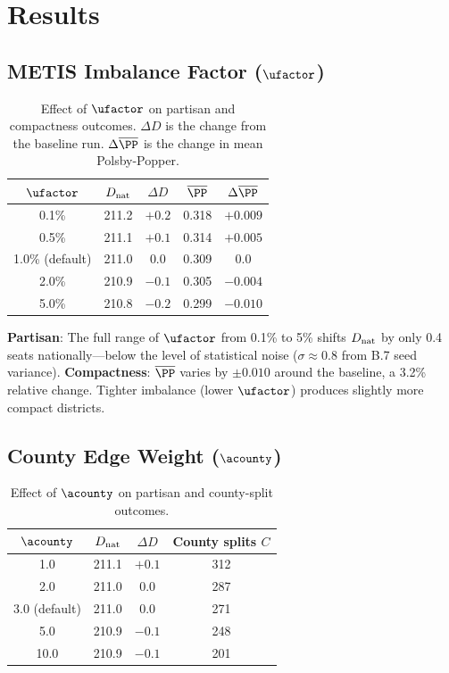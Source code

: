 \section{Results}
\label{sec:results}

\subsection{METIS Imbalance Factor ($\ufactor$)}

\begin{table}[h]
\centering
\caption{Effect of $\ufactor$ on partisan and compactness outcomes.
         $\Delta D$ is the change from the baseline run.
         $\Delta \overline{\PP}$ is the change in mean Polsby-Popper.}
\label{tab:ufactor-results}
\begin{tabular}{ccccc}
\toprule
$\ufactor$ & $D_{\rm nat}$ & $\Delta D$ & $\overline{\PP}$ & $\Delta\overline{\PP}$ \\
\midrule
0.1\% & 211.2 & $+0.2$ & 0.318 & $+0.009$ \\
0.5\% & 211.1 & $+0.1$ & 0.314 & $+0.005$ \\
1.0\% (default) & 211.0 & 0.0 & 0.309 & 0.0 \\
2.0\% & 210.9 & $-0.1$ & 0.305 & $-0.004$ \\
5.0\% & 210.8 & $-0.2$ & 0.299 & $-0.010$ \\
\bottomrule
\end{tabular}
\end{table}

\textbf{Partisan}: The full range of $\ufactor$ from 0.1\% to 5\% shifts
$D_{\rm nat}$ by only 0.4 seats nationally---below the level of statistical
noise ($\sigma \approx 0.8$ from B.7 seed variance).
\textbf{Compactness}: $\overline{\PP}$ varies by $\pm 0.010$ around the
baseline, a 3.2\% relative change.
Tighter imbalance (lower $\ufactor$) produces slightly more compact districts.

\subsection{County Edge Weight ($\acounty$)}

\begin{table}[h]
\centering
\caption{Effect of $\acounty$ on partisan and county-split outcomes.}
\label{tab:acounty-results}
\begin{tabular}{cccc}
\toprule
$\acounty$ & $D_{\rm nat}$ & $\Delta D$ & County splits $C$ \\
\midrule
1.0  & 211.1 & $+0.1$ & 312 \\
2.0  & 211.0 & 0.0    & 287 \\
3.0 (default) & 211.0 & 0.0 & 271 \\
5.0  & 210.9 & $-0.1$ & 248 \\
10.0 & 210.9 & $-0.1$ & 201 \\
\bottomrule
\end{tabular}
\end{table}

